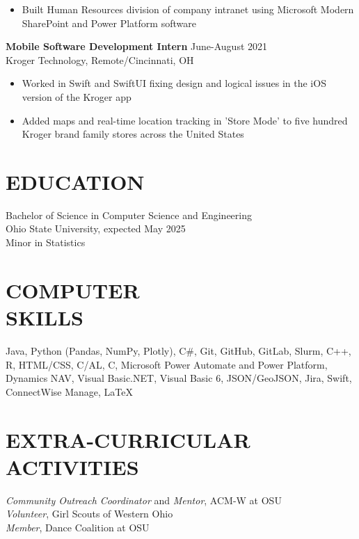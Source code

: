 \documentclass[margin]{res}
\begin{document}
\begin{resume}
\begin{itemize}
                   \item Built Human Resources division of company intranet using Microsoft Modern SharePoint and Power Platform software
                   \end{itemize} 
                {\bf Mobile Software Development Intern} \hfill        June-August 2021 \\
                Kroger Technology, Remote/Cincinnati, OH
                  \begin{itemize}
                    \item Worked in Swift and SwiftUI fixing design and logical  issues in the iOS version of the Kroger app
                    \item Added maps and real-time location tracking in 'Store Mode' to five hundred Kroger brand family stores across the United States
                   \end{itemize} 

\section{EDUCATION} Bachelor of Science in Computer Science and Engineering\\
                Ohio State University, expected May 2025 \\
                Minor in Statistics
                
 
 
\section{COMPUTER \\ SKILLS} Java, Python (Pandas, NumPy, Plotly), C\#, Git, GitHub, GitLab, Slurm, C++, R, HTML/CSS, C/AL, C, Microsoft Power Automate and Power Platform, Dynamics NAV, Visual Basic.NET, Visual Basic 6, JSON/GeoJSON, Jira, Swift, ConnectWise Manage, \LaTeX


\section{EXTRA-CURRICULAR \\ ACTIVITIES}             
            \textit {Community Outreach Coordinator} and \textit{Mentor}, ACM-W at OSU\\
            \textit {Volunteer}, Girl Scouts of Western Ohio\\
            \textit {Member}, Dance Coalition at OSU\\
        
\end{resume}
\end{document}
